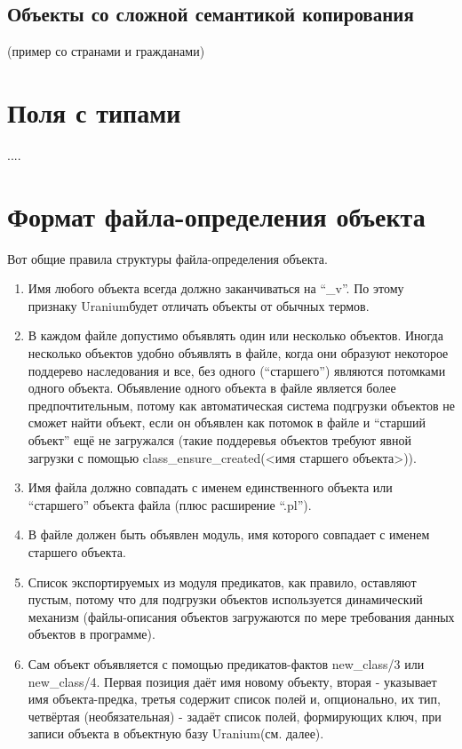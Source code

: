 \documentclass[a4paper]{book}
\def\ur{Uranium}
\begin{document}
\subsection{Объекты со сложной семантикой копирования}
\label{limited_types}

(пример со странами и гражданами)

\section{Поля с типами}

....

\section{Формат файла-определения объекта}
\label{object_file_format}

Вот общие правила структуры файла-определения объекта.

\begin{enumerate}
\item Имя любого объекта всегда должно
  заканчиваться на ``\_v''. По этому признаку \ur будет
  отличать объекты от обычных термов.
\item В каждом файле допустимо объявлять один или несколько
  объектов. Иногда несколько объектов удобно объявлять в файле,
  когда они образуют некоторое поддерево наследования и все, без
  одного (``старшего'') являются потомками одного
  объекта. Объявление одного объекта в файле является более
  предпочтительным, потому как автоматическая система подгрузки
  объектов не сможет найти объект, если он объявлен как потомок в
  файле и ``старший объект'' ещё не загружался (такие поддеревья
  объектов требуют явной загрузки с помощью
  class_ensure_created(<имя старшего объекта>)).
\item Имя файла должно совпадать с именем единственного объекта
  или ``старшего'' объекта файла (плюс расширение ``.pl'').
\item В файле должен быть объявлен модуль, имя которого совпадает
  с именем старшего объекта.
\item Список экспортируемых из модуля предикатов, как правило,
  оставляют пустым, потому что для подгрузки объектов
  используется динамический механизм (файлы-описания объектов
  загружаются по мере требования данных объектов в программе).
\item Сам объект объявляется с помощью предикатов-фактов
  new\_class/3 или new\_class/4. Первая позиция даёт имя новому
  объекту, вторая - указывает имя объекта-предка, третья содержит
  список полей и, опционально, их тип, четвёртая (необязательная)
  - задаёт список полей, формирующих ключ, при записи объекта в
  объектную базу \ur (см. далее).
\end{enumerate}
\end{document}
